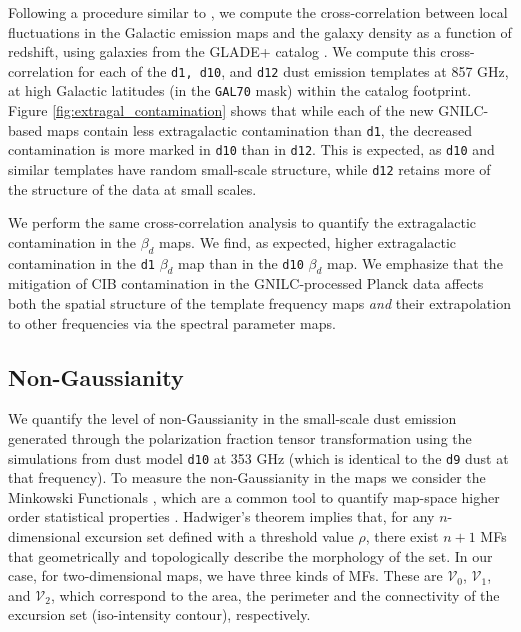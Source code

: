 \documentclass[twocolumn]{aastex631}
\begin{document}
Following a procedure similar to \citet{Chiang:2019}, we compute the cross-correlation between local fluctuations in the Galactic emission maps and the galaxy density as a function of redshift, using galaxies from the GLADE+ catalog \citep{Dalya:2022}. We compute this cross-correlation for each of the \texttt{d1, d10}, and \texttt{d12} dust emission templates at 857 GHz, at high Galactic latitudes (in the \texttt{GAL70} mask) within the catalog footprint. Figure \ref{fig:extragal_contamination} shows that while each of the new GNILC-based maps contain less extragalactic contamination than \texttt{d1}, the decreased contamination is more marked in \texttt{d10} than in \texttt{d12}. This is expected, as \texttt{d10} and similar templates have random small-scale structure, while \texttt{d12} retains more of the structure of the data at small scales. 

We perform the same cross-correlation analysis to quantify the extragalactic contamination in the $\beta_d$ maps. We find, as expected, higher extragalactic contamination in the \texttt{d1} $\beta_d$ map than in the \texttt{d10} $\beta_d$ map. We emphasize that the mitigation of CIB contamination in the GNILC-processed Planck data affects both the spatial structure of the template frequency maps \textit{and} their extrapolation to other frequencies via the spectral parameter maps. 



\subsection{Non-Gaussianity} \label{sec:nongaussianity}

We quantify the level of non-Gaussianity in the small-scale dust emission generated through the polarization fraction tensor transformation using the simulations from dust model \texttt{d10} at 353 GHz (which is identical to the \texttt{d9} dust at that frequency). To measure the non-Gaussianity in the maps we consider the Minkowski Functionals \citep[MFs,][]{Minkowski1903}, which are a common tool to quantify map-space higher order statistical properties \citep{Martire:2023, Carones:2024}. 
Hadwiger’s theorem \citep{hadwigerVorlesungenUeberInhalt1957}
implies that, for any $n$-dimensional excursion set defined with a threshold value $\rho$, there exist $n+1$ MFs that geometrically and topologically describe the morphology of the set. In our case, for two-dimensional maps, we have three kinds of MFs. These are $\mathcal{V}_0$, $\mathcal{V}_1$, and $\mathcal{V}_2$, which correspond to the area, the perimeter and the connectivity of the excursion set (iso-intensity contour), respectively.
\end{document}
